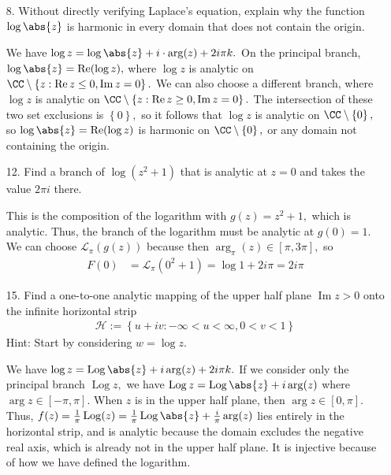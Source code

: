 \documentclass{article}
\DeclareMathOperator{\re}{Re}
\DeclareMathOperator{\im}{Im}
\DeclareMathOperator{\Log}{Log}
\begin{document}
\begin{itemize}
	\item[8.] Without directly verifying Laplace's equation, explain why the function $\log\abs{z}$ is harmonic in every domain that does not contain the origin.
		\begin{answer*}
			We have $\log z = \log\abs{z} + i\cdot\arg(z) + 2i\pi k.$ On the principal branch, $\log\abs{z}=\re(\log z),$ where $\log z$ is analytic on $\CC\setminus\left\{ z:\re z\le 0, \im z = 0 \right\}.$ We can also choose a different branch, where $\log z$ is analytic on $\CC\setminus\left\{ z:\re z \ge 0, \im z = 0 \right\}.$ The intersection of these two set exclusions is $\left\{ 0 \right\},$ so it follows that $\log z$ is analytic on $\CC\setminus\left\{ 0 \right\},$ so $\log\abs{z}=\re (\log z)$ is harmonic on $\CC\setminus\left\{ 0 \right\},$ or any domain not containing the origin.
		\end{answer*}

	\item[12.] Find a branch of $\log(z^2+1)$ that is analytic at $z=0$ and takes the value $2\pi i$ there.
		\begin{soln}
			This is the composition of the logarithm with $g(z)=z^2+1,$ which is analytic. Thus, the branch of the logarithm must be analytic at $g(0)=1.$ We can choose $\mathcal L_{\pi}(g(z))$ because then $\arg_{\pi}(z)\in\left[ \pi, 3\pi \right],$ so
			\begin{align*}
				F(0) &= \mathcal L_{\pi}(0^2+1) = \log 1 + 2i\pi = 2i\pi
			\end{align*}
		\end{soln}
		
	\item[15.] Find a one-to-one analytic mapping of the upper half plane $\im z>0$ onto the infinite horizontal strip
		\begin{align*}
			\mathcal H:=\left\{ u+iv:-\infty<u<\infty, 0<v<1 \right\}
		\end{align*}
		Hint: Start by considering $w=\log z.$
		\begin{soln}
			We have $\log z = \Log\abs{z} + i\arg(z) + 2i\pi k.$ If we consider only the principal branch $\Log z,$ we have $\Log z = \Log \abs{z} + i\arg(z)$ where $\arg z\in[-\pi, \pi].$ When $z$ is in the upper half plane, then $\arg z\in[0, \pi].$ Thus, $f(z) = \frac{1}{\pi} \Log(z) = \frac{1}{\pi}\Log\abs{z} + \frac{i}{\pi}\arg(z)$ lies entirely in the horizontal strip, and is analytic because the domain excludes the negative real axis, which is already not in the upper half plane. It is injective because of how we have defined the logarithm.
		\end{soln}


\end{itemize}
\end{document}
